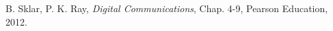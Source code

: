 \documentclass[a4paper,portrait,10pt]{article}   %
\begin{document}

\begin{thebibliography}{99} %

 B. Sklar, P. K. Ray, \textit{Digital Communications}, Chap. 4-9, Pearson Education, 2012.
 
\end{thebibliography}






\end{document}

